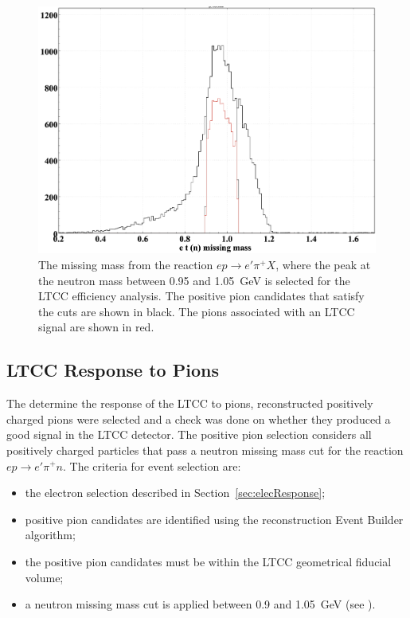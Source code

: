 \begin{figure}[!ht]
	\centering
	\includegraphics[width=0.95\columnwidth,keepaspectratio]{img/neutronMM.png}
	\caption{The missing mass from the reaction $ep \to e'\pi^+X$, where the peak at the neutron mass
          between 0.95 and 1.05~GeV is selected for the LTCC efficiency analysis. The positive pion candidates that
          satisfy the cuts are shown in black. The pions associated with an LTCC signal are shown in red.}
	\label{fig:neutronMM}
\end{figure}

\subsection{LTCC Response to Pions}

The determine the response of the LTCC to pions, reconstructed positively charged pions were selected and a check
was done on whether they produced a good signal in the LTCC detector. The positive pion selection considers all
positively charged particles that pass a neutron missing mass cut for the reaction $ep \to e'\pi^+n$. The criteria
for event selection are:

\begin{itemize}
    \item the electron selection described in Section~\ref{sec:elecResponse};
    \item positive pion candidates are identified using the reconstruction Event Builder algorithm;
    \item the positive pion candidates must be within the LTCC geometrical fiducial volume;
    \item a neutron missing mass cut is applied between 0.9 and 1.05~GeV (see ).
\end{itemize}

